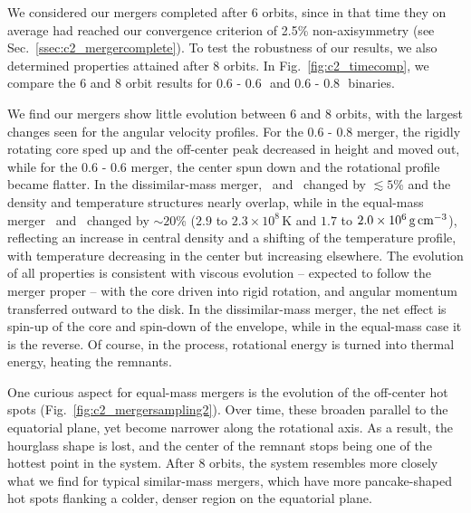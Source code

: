 We considered our mergers completed after 6 orbits, since in that time they on average had reached our convergence criterion of 2.5\% non-axisymmetry (see Sec.~\ref{ssec:c2_mergercomplete}).  To test the robustness of our results, we also determined properties attained after 8 orbits.  In Fig.~\ref{fig:c2_timecomp}, we compare the 6 and 8 orbit results for 0.6 - 0.6\,\Msun\ and 0.6 - 0.8\,\Msun\ binaries.

We find our mergers show little evolution between 6 and 8 orbits, with the largest changes seen for the angular velocity profiles.  For the 0.6 - 0.8 {\Msun} merger, the rigidly rotating core sped up and the off-center peak decreased in height and moved out, while for the 0.6 - 0.6 {\Msun} merger, the center spun down and the rotational profile became flatter.  In the dissimilar-mass merger, \Tmax\ and \rhoTmax\ changed by $\lesssim\!5$\% and the density and temperature structures nearly overlap, while in the equal-mass merger \Tmax\ and \rhoTmax\ changed by $\sim\!20$\% ($2.9$ to $2.3\times10^8\,$K and $1.7$ to $2.0\times10^6\,\gcc$), reflecting an increase in central density and a shifting of the temperature profile, with temperature decreasing in the center but increasing elsewhere.  The evolution of all properties is consistent with viscous evolution -- expected to follow the merger proper -- with the core driven into rigid rotation, and angular momentum transferred outward to the disk.  In the dissimilar-mass merger, the net effect is spin-up of the core and spin-down of the envelope, while in the equal-mass case it is the reverse.  Of course, in the process, rotational energy is turned into thermal energy, heating the remnants.

One curious aspect for equal-mass mergers is the evolution of the off-center hot spots (Fig.~\ref{fig:c2_mergersampling2}).  Over time, these broaden parallel to the equatorial plane, yet become narrower along the rotational axis.  As a result, the hourglass shape is lost, and the center of the remnant stops being one of the hottest point in the system.  After 8 orbits, the system resembles more closely what we find for typical similar-mass mergers, which have more pancake-shaped hot spots flanking a colder, denser region on the equatorial plane.


